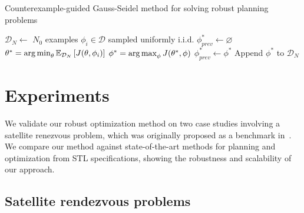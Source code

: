 \begin{algorithm}
    \caption{Counterexample-guided Gauss-Seidel method for solving robust planning problems}\label{ch:iros:alg:cg_gs}
    \DontPrintSemicolon
    $\mathcal{D}_N \gets $ $N_0$ examples $\phi_i \in \mathcal{D}$ sampled uniformly i.i.d.\;
    $\phi^*_{prev} \gets \varnothing$\;
    {
    $\theta^* = \operatorname*{arg\,min}_\theta \mathbb{E}_{\mathcal{D}_N} \left[ J(\theta, \phi_i) \right] \label{ch:iros:alg:opt_theta}$ \;
    $\phi^* = \operatorname*{arg\,max}_\phi J(\theta^*, \phi)$ \label{ch:iros:alg:opt_chi} \;
    $\phi^*_{prev} \gets \phi^*$\;
    Append $\phi^*$ to $\mathcal{D}_N$\;
    }
\end{algorithm}

\section{Experiments}\label{ch:iros:experiments}

We validate our robust optimization method on two case studies involving a satellite renezvous problem, which was originally proposed as a benchmark in~\cite{jewisonSpacecraftBenchmarkProblem2016}. We compare our method against state-of-the-art methods for planning and optimization from STL specifications, showing the robustness and scalability of our approach.

\subsection{Satellite rendezvous problems}

